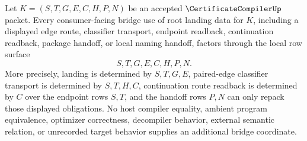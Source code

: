 \begin{theorem}
\label{thm:certificate-compiler-root-landing-bridge-determinacy}
Let $K=(S,T,G,E,C,H,P,N)$ be an accepted $\CertificateCompilerUp$ packet. Every consumer-facing bridge use of root landing data for $K$, including a displayed edge route, classifier transport, endpoint readback, continuation readback, package handoff, or local naming handoff, factors through the local row surface
$$
S,T,G,E,C,H,P,N.
$$
More precisely, landing is determined by $S,T,G,E$, paired-edge classifier transport is determined by $S,T,H,C$, continuation route readback is determined by $C$ over the endpoint rows $S,T$, and the handoff rows $P,N$ can only repack those displayed obligations. No host compiler equality, ambient program equivalence, optimizer correctness, decompiler behavior, external semantic relation, or unrecorded target behavior supplies an additional bridge coordinate.
\end{theorem}
